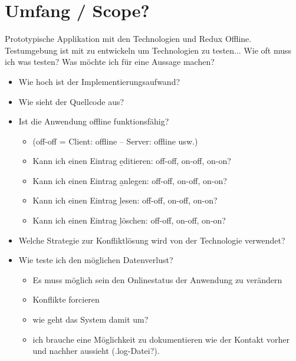 \section{Umfang / Scope?}
Prototypische Applikation mit den Technologien  und Redux Offline. \\
Testumgebung ist mit zu entwickeln um Technologien zu testen...  Wie oft muss ich was testen? Was möchte ich für eine Aussage machen?
\begin{itemize}
  \item Wie hoch ist der Implementierungsaufwand?
  \item Wie sieht der Quellcode aus?
  \item Ist die Anwendung offline funktionsfähig?
  \begin{itemize}
    \item (off-off = Client: offline -- Server: offline usw.)
    \item Kann ich einen Eintrag \b{editieren}: off-off, on-off, on-on?
    \item Kann ich einen Eintrag \b{anlegen:} off-off, on-off, on-on?
    \item Kann ich einen Eintrag \b{lesen}: off-off, on-off, on-on?
    \item Kann ich einen Eintrag \b{löschen}: off-off, on-off, on-on?
  \end{itemize}
  \item Welche Strategie zur Konfliktlösung wird von der Technologie verwendet?
  \item Wie teste ich den möglichen Datenverlust?
  \begin{itemize}
    \item Es muss möglich sein den Onlinestatus der Anwendung zu verändern 
    \item Konflikte forcieren
    \item wie geht das System damit um?
    \item ich brauche eine Möglichkeit zu dokumentieren wie der Kontakt vorher und nachher aussieht (.log-Datei?).
  \end{itemize}
\end{itemize}